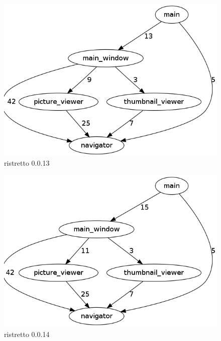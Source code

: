 \begin{figure}[h]
\center
\includegraphics[scale=0.4]{imagens/ristretto-0_0_13-doxyparse-2}
\caption{ristretto 0.0.13}
\label{fig:ristretto-0.0.13-doxyparse-2-anexo}
\end{figure}

\begin{figure}[h]
\center
\includegraphics[scale=0.4]{imagens/ristretto-0_0_14-doxyparse-2}
\caption{ristretto 0.0.14}
\label{fig:ristretto-0.0.14-doxyparse-2-anexo}
\end{figure}

